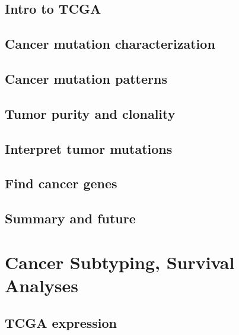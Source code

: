 \documentclass[
]{book}
\begin{document}
\hypertarget{intro-to-tcga}{%
\section{Intro to TCGA}\label{intro-to-tcga}}

\hypertarget{cancer-mutation-characterization}{%
\section{Cancer mutation characterization}\label{cancer-mutation-characterization}}

\hypertarget{cancer-mutation-patterns}{%
\section{Cancer mutation patterns}\label{cancer-mutation-patterns}}

\hypertarget{tumor-purity-and-clonality}{%
\section{Tumor purity and clonality}\label{tumor-purity-and-clonality}}

\hypertarget{interpret-tumor-mutations}{%
\section{Interpret tumor mutations}\label{interpret-tumor-mutations}}

\hypertarget{find-cancer-genes}{%
\section{Find cancer genes}\label{find-cancer-genes}}

\hypertarget{summary-and-future}{%
\section{Summary and future}\label{summary-and-future}}

\hypertarget{cancersub}{%
\chapter{Cancer Subtyping, Survival Analyses}\label{cancersub}}

\hypertarget{tcga-expression}{%
\section{TCGA expression}\label{tcga-expression}}
\end{document}
